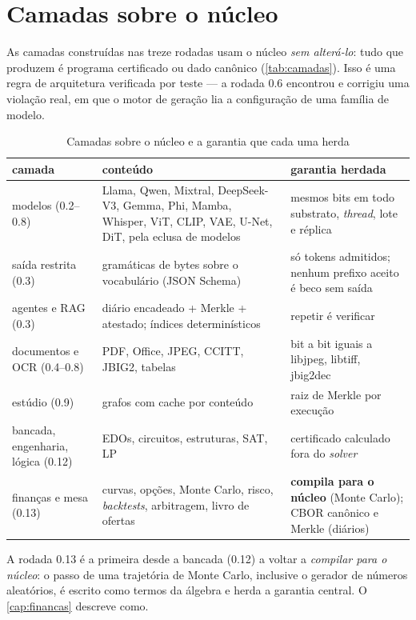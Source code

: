 \section{Camadas sobre o núcleo}\label{sec:arq-camadas}

As camadas construídas nas treze rodadas usam o núcleo \emph{sem alterá-lo}: tudo que produzem é programa certificado ou dado canônico (\autoref{tab:camadas}). Isso é uma regra de arquitetura verificada por teste --- a rodada 0.6 encontrou e corrigiu uma violação real, em que o motor de geração lia a configuração de uma família de modelo.

\begin{table}[htbp]
\centering
\caption{Camadas sobre o núcleo e a garantia que cada uma herda}\label{tab:camadas}
\small
\begin{tabularx}{\textwidth}{@{}lXX@{}}
\toprule
\textbf{camada} & \textbf{conteúdo} & \textbf{garantia herdada}\\
\midrule
modelos (0.2--0.8) & Llama, Qwen, Mixtral, DeepSeek-V3, Gemma, Phi, Mamba, Whisper, ViT, CLIP, VAE, U-Net, DiT, pela eclusa de modelos & mesmos bits em todo substrato, \textit{thread}, lote e réplica\\
saída restrita (0.3) & gramáticas de bytes sobre o vocabulário (JSON Schema) & só tokens admitidos; nenhum prefixo aceito é beco sem saída\\
agentes e RAG (0.3) & diário encadeado + Merkle + atestado; índices determinísticos & repetir é verificar\\
documentos e OCR (0.4--0.8) & PDF, Office, JPEG, CCITT, JBIG2, tabelas & bit a bit iguais a libjpeg, libtiff, jbig2dec\\
estúdio (0.9) & grafos com cache por conteúdo & raiz de Merkle por execução\\
bancada, engenharia, lógica (0.12) & EDOs, circuitos, estruturas, SAT, LP & certificado calculado fora do \textit{solver}\\
finanças e mesa (0.13) & curvas, opções, Monte Carlo, risco, \textit{backtests}, arbitragem, livro de ofertas & \textbf{compila para o núcleo} (Monte Carlo); CBOR canônico e Merkle (diários)\\
\bottomrule
\end{tabularx}
\end{table}

A rodada 0.13 é a primeira desde a bancada (0.12) a voltar a \emph{compilar para o núcleo}: o passo de uma trajetória de Monte Carlo, inclusive o gerador de números aleatórios, é escrito como termos da álgebra e herda a garantia central. O \autoref{cap:financas} descreve como.
